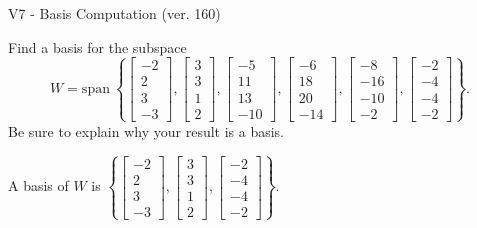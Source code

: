 \begin{exercise}
  \begin{exerciseTitle}V7 - Basis Computation (ver. 160)\end{exerciseTitle}
  \begin{exerciseStatement}
    Find a basis for the subspace 
\[W=\mathrm{span}\ \left\{\left[\begin{array}{r}
-2 \\
2 \\
3 \\
-3
\end{array}\right] , \left[\begin{array}{r}
3 \\
3 \\
1 \\
2
\end{array}\right] , \left[\begin{array}{r}
-5 \\
11 \\
13 \\
-10
\end{array}\right] , \left[\begin{array}{r}
-6 \\
18 \\
20 \\
-14
\end{array}\right] , \left[\begin{array}{r}
-8 \\
-16 \\
-10 \\
-2
\end{array}\right] , \left[\begin{array}{r}
-2 \\
-4 \\
-4 \\
-2
\end{array}\right]\right\}.\]
 Be sure to explain why your result is a basis.


  \end{exerciseStatement}
  \begin{exerciseAnswer}
   A basis of \(W\) is  \(\left\{\left[\begin{array}{r}
-2 \\
2 \\
3 \\
-3
\end{array}\right] , \left[\begin{array}{r}
3 \\
3 \\
1 \\
2
\end{array}\right] , \left[\begin{array}{r}
-2 \\
-4 \\
-4 \\
-2
\end{array}\right]\right\}\).
  


  \end{exerciseAnswer}
\end{exercise}